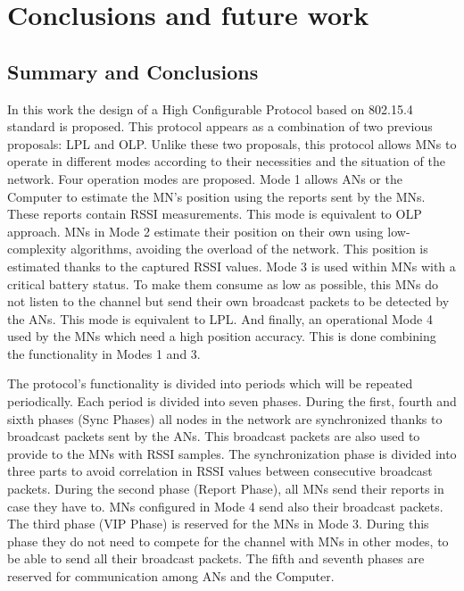\chapter{Conclusions and future work}
\label{chap:conclusionsandfuture}

\section{Summary and Conclusions}

In this work the design of a High Configurable Protocol based on 802.15.4 standard is proposed. This protocol appears as a combination of two
previous proposals: \ac{LPL} and \ac{OLP}. Unlike these two proposals, this protocol allows \acp{MN} to operate in different modes according to 
their necessities and the situation of the network. Four operation modes are proposed. Mode 1 allows \acp{AN} or the Computer to estimate the 
\ac{MN}'s position using the reports sent by the \acp{MN}. These reports contain \ac{RSSI} measurements. This mode is equivalent to \ac{OLP}
approach. \acp{MN} in Mode 2 estimate their position on their own using low-complexity algorithms, avoiding the overload of the network. This 
position is estimated thanks to the captured \ac{RSSI} values. Mode 3 is used within \acp{MN} with a critical battery status. To make them 
consume as low as possible, this \acp{MN} do not listen to the channel but send their own broadcast packets to be detected by the \acp{AN}. 
This mode is equivalent to \ac{LPL}. And finally, an operational Mode 4 used by the \acp{MN} which need a high position accuracy. This is 
done combining the functionality in Modes 1 and 3.

The protocol's functionality is divided into periods which will be repeated periodically. Each period is divided into seven phases. During 
the first, fourth and sixth phases (Sync Phases) all nodes in the network are synchronized thanks to broadcast packets sent by the \acp{AN}. 
This broadcast packets are also used to provide to the \acp{MN} with \ac{RSSI} samples. The synchronization phase is divided into three parts 
to avoid correlation in \ac{RSSI} values between consecutive broadcast packets. During the second phase (Report Phase), all \acp{MN} send their
reports in case they have to. \acp{MN} configured in Mode 4 send also their broadcast packets. The third phase (\ac{VIP} Phase) is reserved for the \acp{MN} in Mode
3. During this phase they do not need to compete for the channel with \acp{MN} in other modes, to be able to send all their broadcast packets. 
The fifth and seventh phases are reserved for communication among \acp{AN} and the Computer.

